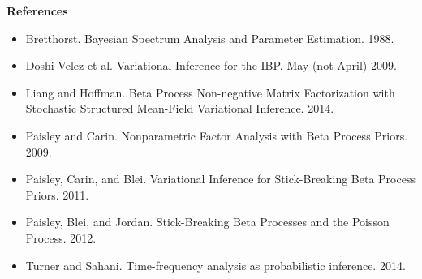 \documentclass[11pt]{article}
\theoremstyle{definition}
\theoremstyle{plain}
\begin{document}
\begin{center} \textbf{References} \end{center}
    \begin{itemize}
        \item Bretthorst. Bayesian Spectrum Analysis and Parameter Estimation. 1988.
        \item Doshi-Velez et al. Variational Inference for the IBP. May (not April) 2009.
        \item Liang and Hoffman. Beta Process Non-negative Matrix Factorization with Stochastic Structured Mean-Field Variational Inference. 2014.
        \item Paisley and Carin. Nonparametric Factor Analysis with Beta Process Priors. 2009.
        \item Paisley, Carin, and Blei. Variational Inference for Stick-Breaking Beta Process Priors. 2011.
        \item Paisley, Blei, and Jordan. Stick-Breaking Beta Processes and the Poisson Process. 2012.
        \item Turner and Sahani. Time-frequency analysis as probabilistic inference. 2014. 
    \end{itemize}
\end{document}
